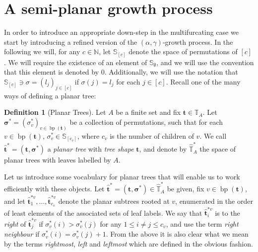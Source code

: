 \documentclass[a4paper, final]{amsart}
\theoremstyle{plain}
\theoremstyle{definition}
\newtheorem{defi}[thm]{Definition}
\newcommand{\tree}[1][t]{\boldsymbol{#1}}
\newcommand{\that}[1][t]{\hat{\boldsymbol{#1}}} %
\newcommand{\treesigma}[1][\sigma]{\boldsymbol{#1}}
\newcommand{\Thatspace}[1][\T]{\widehat{\boldsymbol{#1}}} %
\newcommand{\T}{\mathbb{T}}
\DeclareMathOperator{\branchpoints}{bp}
\renewcommand{\SS}{\mathbb{S}}
\newcommand{\N}{\mathbb{N}}
\begin{document}
\section{A semi-planar growth process}
\label{sec:semiplanar_alphagamma}
%
In order to introduce an appropriate down-step in the multifurcating case we start by introducing a refined version of the $(\alpha, \gamma)$-growth process.
In the following we will, for any $c \in \N$, let $\SS_{[c]}$ denote the space of permutations of $[c]$.
We will require the existence of an element of $\SS_\emptyset$, and we will use the convention that this element is denoted by $0$.
Additionally, we will use the notation that $\SS_{[c]} \ni \sigma = {(l_j)}_{j \in [c]}$ if $\sigma(j) = l_j$ for each $j \in [c]$.
Recall one of the many ways of defining a planar tree:
\begin{defi}[Planar Trees]
  Let $A$ be a finite set and fix $\tree \in \T_A$.
  Let $\treesigma^* = {\left( \sigma_v^* \right)}_{v \in \branchpoints(\tree)}$ be a collection of permutations, such that for each $v \in \branchpoints (\tree)$, $\sigma_v^* \in \SS_{[c_v]}$, where $c_v$ is the number of children of $v$.
  We call $\that^* = (\tree, \treesigma^*)$ a \textit{planar tree} with \textit{tree shape} $\tree$, and denote by $\Thatspace_A^*$ the space of planar trees with leaves labelled by $A$.
\end{defi}
Let us introduce some vocabulary for planar trees that will enable us to work efficiently with these objects.
Let $\hat{\tree}^* = \left( \tree, \treesigma^* \right) \in \Thatspace_A^*$ be given, fix $v \in \branchpoints(\tree)$, and let $\that_1^{*v}, \ldots, \that_{c_v}^{*v}$ denote the planar subtrees rooted at $v$, enumerated in the order of least elements of the associated sets of leaf labels.
We say that $\that_i^{*v}$ is to the \textit{right} of $\that_j^{*v}$ if $\sigma_v^*(i) > \sigma_v^*(j)$ for any $1 \leq i \neq j \leq c_v$, and use the term \textit{right neighbour} if $\sigma_v^*(i) = \sigma_v^*(j) + 1$.
From the above it is also clear what we mean by the terms \textit{rightmost}, \textit{left} and \textit{leftmost} which are defined in the obvious fashion. 
\end{document}
